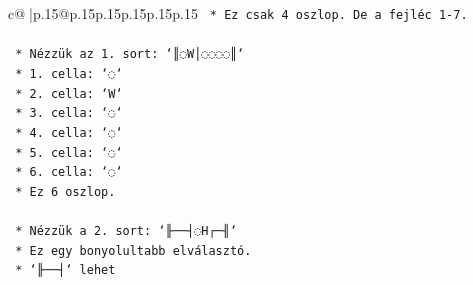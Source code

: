\documentclass{article}
\begin{document}
{\begin{supertabular}{c@{$\;$}|p{.15\linewidth}@{}p{.15\linewidth}p{.15\linewidth}p{.15\linewidth}p{.15\linewidth}p{.15\linewidth}}
{{{\texttt{        *   Ez csak 4 oszlop. De a fejléc 1{-}7.} \\
\\ 
\texttt{    *   Nézzük az 1. sort: `║◌W│◌◌◌◌║`} \\
\texttt{        *   1. cella: `◌`} \\
\texttt{        *   2. cella: `W`} \\
\texttt{        *   3. cella: `◌`} \\
\texttt{        *   4. cella: `◌`} \\
\texttt{        *   5. cella: `◌`} \\
\texttt{        *   6. cella: `◌`} \\
\texttt{        *   Ez 6 oszlop.} \\
\\ 
\texttt{    *   Nézzük a 2. sort: `╟──┤◌H┌─╢`} \\
\texttt{        *   Ez egy bonyolultabb elválasztó.} \\
\texttt{        *   `╟──┤` lehet} \\
            }
        }
    }
     \\ \\


\end{supertabular}}
\end{document}
